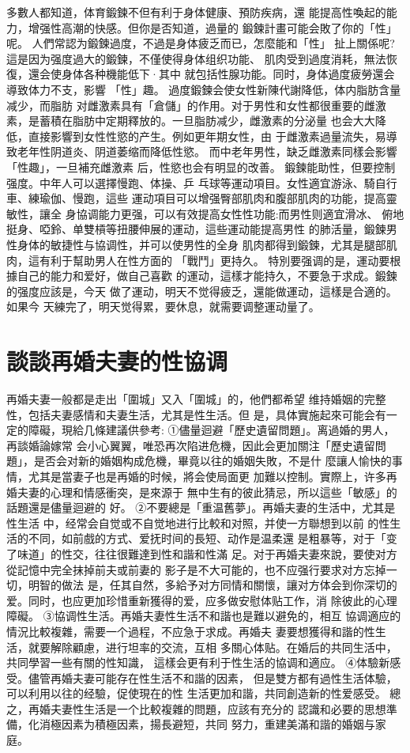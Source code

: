 \documentclass[12pt,UTF8]{ctexbook}
\begin{document}
多數人都知道，体育鍛鍊不但有利于身体健康、預防疾病，還
能提高性喚起的能力，增强性高潮的快感。但你是否知道，過量的
鍛鍊計畫可能会敗了你的「性」呢。
人們常認为鍛鍊過度，不過是身体疲乏而已，怎麼能和「性」
扯上關係呢?這是因为强度過大的鍛鍊，不僅使得身体组织功能、
肌肉受到過度消耗，無法恢復，還会使身体各种機能低下·其中
就包括性腺功能。同时，身体過度疲勞還会導致体力不支，影響
「性」趣。
過度鍛鍊会使女性新陳代謝降低，体内脂肪含量减少，而脂肪
对雌激素具有「倉儲」的作用。对于男性和女性都很重要的雌激
素，是蓄積在脂肪中定期釋放的。一旦脂肪减少，雌激素的分泌量
也会大大降低，直接影響到女性性慾的产生。例如更年期女性，由
于雌激素過量流失，易導致老年性阴道炎、阴道萎缩而降低性慾。
而中老年男性，缺乏雌激素同樣会影響「性趣」，一旦補充雌激素
后，性慾也会有明显的改善。
鍛鍊能助性，但要控制强度。中年人可以選擇慢跑、体操、乒
乓球等運动項目。女性適宜游泳、騎自行車、練瑜伽、慢跑，這些
運动項目可以增强臀部肌肉和腹部肌肉的功能，提高靈敏性，讓全
身協调能力更强，可以有效提高女性性功能:而男性则適宜滑冰、
俯地挺身、啞鈴、单雙槓等扭腰伸展的運动，這些運动能提高男性
的肺活量，鍛鍊男性身体的敏捷性与協调性，并可以使男性的全身
肌肉都得到鍛鍊，尤其是腿部肌肉，這有利于幫助男人在性方面的
「戰鬥」更持久。
特別要强调的是，運动要根據自己的能力和爱好，做自己喜歡
的運动，這樣才能持久，不要急于求成。鍛鍊的强度应該是，今天
做了運动，明天不觉得疲乏，還能做運动，這樣是合適的。如果今
天練完了，明天觉得累，要休息，就需要调整運动量了。

\section{談談再婚夫妻的性協调}

再婚夫妻一般都是走出「圍城」又入「圍城」的，他們都希望
维持婚姻的完整性，包括夫妻感情和夫妻生活，尤其是性生活。但
是，具体實施起來可能会有一定的障礙，現給几條建議供參考:
①儘量迴避「歷史遺留問題」。离過婚的男人，再談婚論嫁常
会小心翼翼，唯恐再次陷进危機，因此会更加關注「歷史遺留問
題」，是否会对新的婚姻构成危機，畢竟以往的婚姻失敗，不是什
麼讓人愉快的事情，尤其是當妻子也是再婚的时候，將会使局面更
加難以控制。實際上，许多再婚夫妻的心理和情感衝突，是來源于
無中生有的彼此猜忌，所以這些「敏感」的話題還是儘量迴避的
好。
②不要總是「重温舊夢」。再婚夫妻的生活中，尤其是性生活
中，经常会自觉或不自觉地进行比較和对照，并使一方聯想到以前
的性生活的不同，如前戲的方式、爱抚时间的長短、动作是温柔還
是粗暴等，对于「变了味道」的性交，往往很難達到性和諧和性滿
足。对于再婚夫妻來說，要使对方從記憶中完全抹掉前夫或前妻的
影子是不大可能的，也不应强行要求对方忘掉一切，明智的做法
是，任其自然，多給予对方同情和關懷，讓对方体会到你深切的
爱。同时，也应更加珍惜重新獲得的爱，应多做安慰体贴工作，消
除彼此的心理障礙。
③協调性生活。再婚夫妻性生活不和諧也是難以避免的，相互
協调適应的情況比較複雜，需要一个過程，不应急于求成。再婚夫
妻要想獲得和諧的性生活，就要解除顧慮，进行坦率的交流，互相
多關心体贴。在婚后的共同生活中，共同學習一些有關的性知識，
這樣会更有利于性生活的協调和適应。
④体驗新感受。儘管再婚夫妻可能存在性生活不和諧的因素，
但是雙方都有過性生活体驗，可以利用以往的经驗，促使現在的性
生活更加和諧，共同創造新的性爱感受。
總之，再婚夫妻性生活是一个比較複雜的問題，应該有充分的
認識和必要的思想準備，化消極因素为積極因素，揚長避短，共同
努力，重建美滿和諧的婚姻与家庭。
\end{document}

